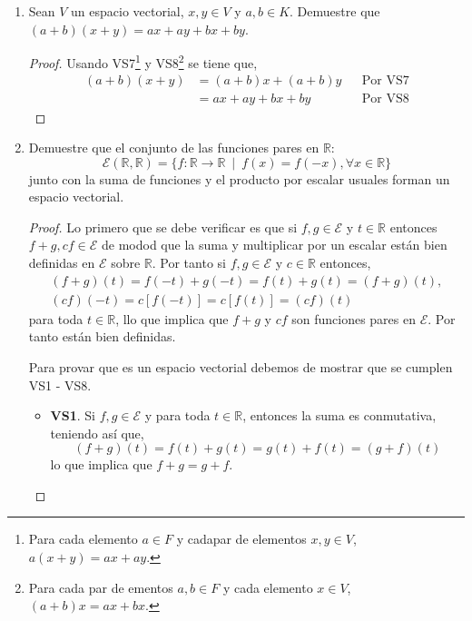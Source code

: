 \documentclass[11pt,letterpaper]{article}
\newcommand{\R}{\mathbb{R}}
\begin{document}
\begin{enumerate}
\begin{enumerate}[label=(\alph*)]
    \item Para cada vector $x \in V$ su invierso aditivo es único.
    \begin{proof}
        Dado el vector $x \in V$ y sean $y, y' \in V$ tal que satisfacen VS4. Entonces
        $x + y = 0 = x + y'$, pero por el inciso anterior se demostró  ``La Ley de la cancelación para
        la suma de vectores'', entonces ``cancelando'' a $x$ se concluye que $y = y'$.
    \end{proof}
\end{enumerate}

\item Sean $V$ un espacio vectorial, $x,y \in V$ y $a,b \in K$. Demuestre que
$(a + b)(x + y) = ax + ay + bx + by$.
\begin{proof}
    Usando VS7\footnote{Para cada elemento $a \in F$ y cadapar de elementos $x,y \in V$, 
    $a(x+y)=ax + ay$.} y VS8\footnote{Para cada par de ementos $a,b \in F$ y cada elemento
    $x \in V$, $(a+b)x=ax+bx$.} se tiene que,
    \begin{align*}
        (a + b)(x + y)
            &= (a + b)x + (a + b)y && \text{Por VS7}\\
            &= ax + ay + bx + by && \text{Por VS8}
    \end{align*}
\end{proof}

\item Demuestre que el conjunto de las funciones pares en $\R$:
\[
    \mathscr{E}(\R, \R) = \{ f: \R \to \R \  \mid \  f(x) = f(-x), \forall x \in \R \}
\]
junto con la suma de funciones y el producto por escalar usuales forman un espacio vectorial.
\begin{proof}
    Lo primero que se debe verificar es que si $f, g \in \mathscr{E}$ y $t \in \R$ entonces
    $f+g, cf \in \mathscr{E}$ de modod que la suma y multiplicar por un escalar están bien
    definidas en $\mathscr{E}$ sobre $\R$. Por tanto si $f,g \in \mathscr{E}$ y $c \in \R$ entonces,
    \begin{align*}    
        (f+g)(t)=f(-t)+g(-t)=f(t)+g(t)=(f+g)(t),\\
        (cf)(-t)=c[f(-t)]=c[f(t)]=(cf)(t)
    \end{align*}
    para toda $t \in \R$, llo que implica que $f+g$ y $cf$ son funciones pares en $\mathscr{E}$.
    Por tanto están bien definidas.

    Para provar que es un espacio vectorial debemos de mostrar que se cumplen VS1 - VS8.
    \begin{itemize}
        \item \textbf{VS1}. Si $f,g \in \mathscr{E}$ y para toda $t \in \R$,
        entonces la suma es conmutativa, teniendo así que,
        \[ (f+g)(t) = f(t)+g(t)=g(t)+f(t)=(g+f)(t) \]
        lo que implica que $f+g=g+f$.
        

\end{itemize}
\end{proof}
\end{enumerate}
\end{document}
